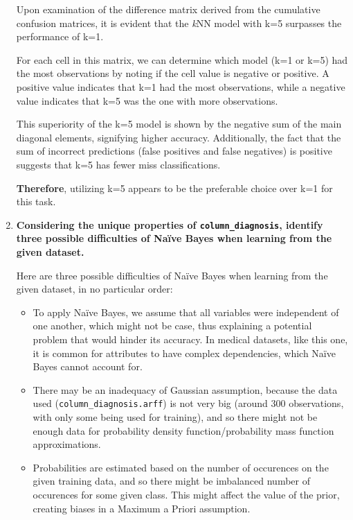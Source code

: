 \documentclass[12pt]{article}
\begin{document}
\begin{enumerate}[leftmargin=\labelsep]
        Upon examination of the difference matrix derived from the cumulative confusion matrices, it is evident that the \textit{k}NN model
        with k=5 surpasses the performance of k=1.

        For each cell in this matrix, we can determine which model (k=1 or k=5) had the most observations by noting if
        the cell value is negative or positive. A positive value indicates that k=1 had the most observations, while
        a negative value indicates that k=5 was the one with more observations.

        This superiority of the k=5 model is shown by the negative sum of the main diagonal elements, signifying higher accuracy.
        Additionally, the fact that the sum of incorrect predictions (false positives and false negatives) is positive suggests that
        k=5 has fewer miss classifications.

        \textbf{Therefore}, utilizing k=5 appears to be the preferable choice over k=1 for this task.

  \item \textbf{Considering the unique properties of \texttt{column\_diagnosis}, identify three possible difficulties
          of Naïve Bayes when learning from the given dataset.}

        \vskip 0.3cm
        Here are three possible difficulties of Naïve Bayes when learning from the given dataset, in no particular order:

        \begin{itemize}
          \item To apply Naïve Bayes, we assume that all variables were independent of one another, which might not be case, thus explaining a
                potential problem that would hinder its accuracy. In medical datasets, like this one, it is common for attributes to have complex
                dependencies, which Naïve Bayes cannot account for.
          \item There may be an inadequacy of Gaussian assumption, because the data used (\texttt{column\_diagnosis.arff}) is not very big
                (around 300 observations, with only some being used for training), and so there might not be enough data for probability density
                function/probability mass function approximations.
          \item Probabilities are estimated based on the number of occurences on the given training data, and so there might be imbalanced
                number of occurences for some given class. This might affect the value of the prior, creating biases in a Maximum a Priori
                assumption.
        \end{itemize}
\end{enumerate}
\end{document}
